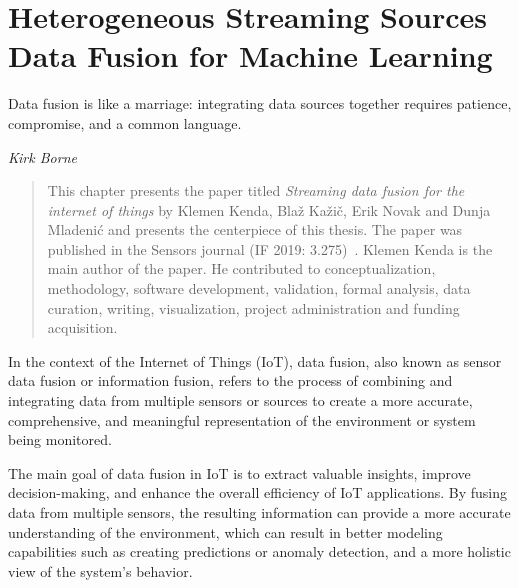 \chapter{Heterogeneous Streaming Sources Data Fusion for Machine Learning}
\label{ch:data-fusion}

\epigraph{Data fusion is like a marriage: integrating data sources together requires patience, compromise, and a common language.}{\textit{Kirk Borne}}

\begin{quote}
This chapter presents the paper titled \textit{Streaming data fusion for the internet of things} by Klemen Kenda, Blaž Kažič, Erik Novak and Dunja Mladenić and presents the centerpiece of this thesis. The paper was published in the Sensors journal (IF 2019: 3.275)~\cite{kenda:2019:fusion}.
Klemen Kenda is the main author of the paper. 
He contributed to conceptualization, methodology, software development, validation, formal analysis, data curation, writing, visualization, project administration and funding acquisition.
\end{quote}

In the context of the Internet of Things (IoT), data fusion, also known as sensor data fusion or information fusion, refers to the process of combining and integrating data from multiple sensors or sources to create a more accurate, comprehensive, and meaningful representation of the environment or system being monitored. 

The main goal of data fusion in IoT is to extract valuable insights, improve decision-making, and enhance the overall efficiency of IoT applications. 
By fusing data from multiple sensors, the resulting information can provide a more accurate understanding of the environment, which can result in better modeling capabilities such as creating predictions or anomaly detection, and a more holistic view of the system's behavior. 

